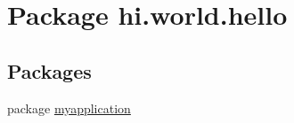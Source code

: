 \hypertarget{namespacehi_1_1world_1_1hello}{}\section{Package hi.\+world.\+hello}
\label{namespacehi_1_1world_1_1hello}
\subsection*{Packages}
\begin{DoxyCompactItemize}
\item 
package \mbox{\hyperlink{namespacehi_1_1world_1_1hello_1_1myapplication}{myapplication}}
\end{DoxyCompactItemize}
